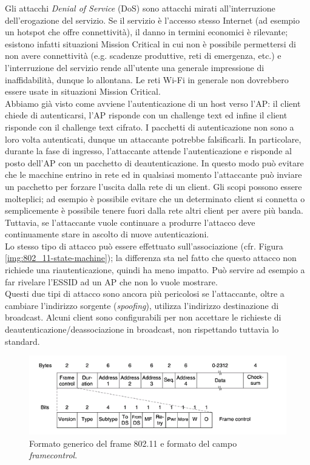 Gli attacchi \textit{Denial of Service} (DoS) sono attacchi mirati all'interruzione dell'erogazione del servizio. Se il servizio è l'accesso stesso Internet (ad esempio un hotspot che offre connettività), il danno in termini economici è rilevante; esistono infatti situazioni Mission Critical in cui non è possibile permettersi di non avere connettività (e.g. scadenze produttive, reti di emergenza, etc.) e l'interruzione del servizio rende all'utente una generale impressione di inaffidabilità, dunque lo allontana. Le reti Wi-Fi in generale non dovrebbero essere usate in situazioni Mission Critical.\\
Abbiamo già visto come avviene l'autenticazione di un host verso l'AP: il client chiede di autenticarsi, l'AP risponde con un challenge text ed infine il client risponde con il challenge text cifrato. I pacchetti di autenticazione non sono a loro volta autenticati, dunque un attaccante potrebbe falsificarli. In particolare, durante la fase di ingresso, l'attaccante attende l'autenticazione e risponde al posto dell'AP con un pacchetto di deautenticazione. In questo modo può evitare che le macchine entrino in rete ed in qualsiasi momento l'attaccante può inviare un pacchetto per forzare l'uscita dalla rete di un client. Gli scopi possono essere molteplici; ad esempio è possibile evitare che un determinato client si connetta o semplicemente è possibile tenere fuori dalla rete altri client per avere più banda. Tuttavia, se l'attaccante vuole continuare a produrre l'attacco deve continuamente stare in ascolto di nuove autenticazioni.\\
Lo stesso tipo di attacco può essere effettuato sull'associazione (cfr. Figura \ref{img:802_11-state-machine}); la differenza sta nel fatto che questo attacco non richiede una riautenticazione, quindi ha meno impatto. Può servire ad esempio a far rivelare l'ESSID ad un AP che non lo vuole mostrare.\\
Questi due tipi di attacco sono ancora più pericolosi se l'attaccante, oltre a cambiare l'indirizzo sorgente (\textit{spoofing}), utilizza l'indirizzo destinazione di broadcast. Alcuni client sono configurabili per non accettare le richieste di deautenticazione/deassociazione in broadcast, non rispettando tuttavia lo standard.
\begin{figure}[htbp]
	\centering
	\includegraphics[scale = 0.8]{images/802_11-frame}
	\caption{Formato generico del frame 802.11 e formato del campo \textit{framecontrol}.}
	\label{img:802_11-frame}
\end{figure}\\
